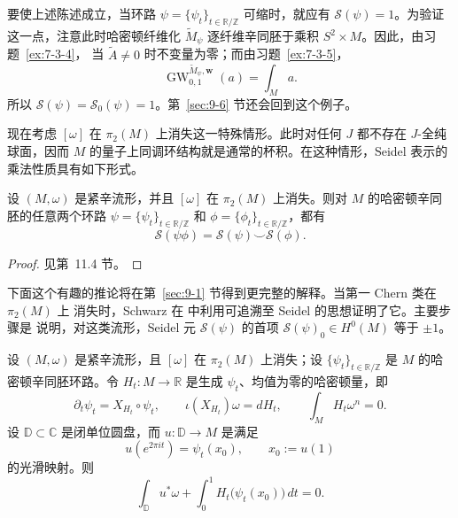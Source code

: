 \begin{example}
要使上述陈述成立，当环路
$\psi=\{\psi_t\}_{t\in\mathbb R/\mathbb Z}$ 可缩时，就应有
$\mathcal S(\psi)=1$。为验证这一点，注意此时哈密顿纤维化
$\widetilde M_\psi$ 逐纤维辛同胚于乘积 $S^2\times M$。因此，由习题~\ref{ex:7-3-4}，
当 $\widetilde A\ne0$ 时不变量为零；而由习题~\ref{ex:7-3-5}，
\[
  \operatorname{GW}^{\widetilde M_\psi,\mathbf w}_{0,1}(a)=\int_Ma.
\]
所以 $\mathcal S(\psi)=\mathcal S_0(\psi)=1$。第~\ref{sec:9-6} 节还会回到这个例子。
\end{example}

现在考虑 $[\omega]$ 在 $\pi_2(M)$ 上消失这一特殊情形。此时对任何 $J$ 都不存在
$J$-全纯球面，因而 $M$ 的量子上同调环结构就是通常的杯积。在这种情形，Seidel 表示的
乘法性质具有如下形式。

\begin{theorem}[Seidel]\label{thm:8-6-9}
设 $(M,\omega)$ 是紧辛流形，并且 $[\omega]$ 在 $\pi_2(M)$ 上消失。则对
$M$ 的哈密顿辛同胚的任意两个环路
$\psi=\{\psi_t\}_{t\in\mathbb R/\mathbb Z}$ 和
$\phi=\{\phi_t\}_{t\in\mathbb R/\mathbb Z}$，都有
\[
  \mathcal S(\psi\phi)=\mathcal S(\psi)\smile\mathcal S(\phi).
\]
\end{theorem}

\begin{proof}
见第~11.4 节。
\end{proof}

下面这个有趣的推论将在第~\ref{sec:9-1} 节得到更完整的解释。当第一 Chern 类在 $\pi_2(M)$ 上
消失时，Schwarz 在  中利用可追溯至 Seidel 的思想证明了它。主要步骤是
说明，对这类流形，Seidel 元 $\mathcal S(\psi)$ 的首项
$\mathcal S(\psi)_0\in H^0(M)$ 等于 $\pm1$。

\begin{corollary}[Schwarz]\label{cor:8-6-10}
设 $(M,\omega)$ 是紧辛流形，且 $[\omega]$ 在 $\pi_2(M)$ 上消失；设
$\{\psi_t\}_{t\in\mathbb R/\mathbb Z}$ 是 $M$ 的哈密顿辛同胚环路。令
$H_t:M\to\mathbb R$ 是生成 $\psi_t$、均值为零的哈密顿量，即
\[
  \partial_t\psi_t=X_{H_t}\circ\psi_t,\qquad
  \iota(X_{H_t})\omega=dH_t,\qquad
  \int_M H_t\omega^n=0.
\]
设 $\mathbb D\subset\mathbb C$ 是闭单位圆盘，而 $u:\mathbb D\to M$ 是满足
\[
  u(e^{2\pi it})=\psi_t(x_0),\qquad x_0:=u(1)
\]
的光滑映射。则
\[
  \int_{\mathbb D}u^*\omega
  +\int_0^1H_t\bigl(\psi_t(x_0)\bigr)\,dt=0.
\]
\end{corollary}

